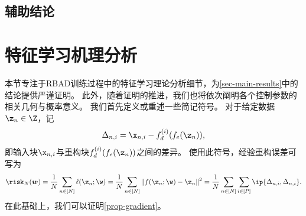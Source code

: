 \subsection{辅助结论}

\section{特征学习机理分析}\label{sec-proof}

本节专注于RBAD训练过程中的特征学习理论分析细节，为\cref{sec-main-results}中的结论提供严谨证明。
此外，随着证明的推进，我们也将依次阐明各个控制参数的相关几何与概率意义。
我们首先定义或重述一些简记符号。
对于给定数据$\z_n \in \Z$，记
\begin{equation}
\Delta_{n,i} = \x_{n,i} - f_d^{(i)} (f_e(\z_n)),    
\end{equation}
即输入块$\x_{n,i}$与重构块$f_d^{(i)} (f_e(\z_n))$之间的差异。
使用此符号，经验重构误差可写为
\begin{equation*}
    \risk_N(\boldsymbol{w}) 
    = \frac{1}{N} \sum_{n \in [N]} \ell(\z_n;\w) 
    = \frac{1}{N} \sum_{n \in [N]} \| f(\z_n;\w) - \z_n \|^2 
    = \frac{1}{N} \sum_{n \in [N]} \sum_{i \in [P]} \ip{\Delta_{n,i},\Delta_{n,i}}.
\end{equation*}
在此基础上，我们可以证明\cref{prop-gradient}。
